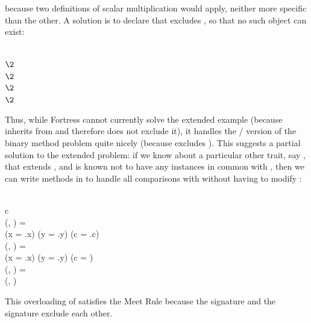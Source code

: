 because two definitions of scalar multiplication would apply, neither more specific than
the other.  A solution is to declare that  excludes ,
so that no such object can exist:
\begin{codeexamplesize}
\begin{tabbing}
 \\
\(\2\) \\
\(\2\) \\
\(\2\) \\
\(\2\) \\
\end{tabbing}
\end{codeexamplesize}
Thus, while Fortress cannot currently solve the extended 
example (because  inherits from  and therefore does
not exclude it), it handles the / version of the
binary method problem quite nicely (because  excludes ).
This suggests a partial solution to the extended  problem:
if we know about a particular other trait, say ,
that extends , and is known not to have any instances in
common with , then we can write  methods in 
to handle all comparisons with  without having to modify :
\begin{codeexamplesize}
\begin{FortressCode}
     \lbrace\,\,\rbrace \\
\2\+c\COLON {} \\
  (, \COLON {})\COLON {} = \\
  \2\+(x = .x) \wedge (y = .y) \wedge (c = .c)\- \\
  (, \COLON {})\COLON {} = \\
  \2\+(x = .x) \wedge (y = .y) \wedge (c = )\- \\
  (\COLON {}, )\COLON {} = \\
  \2\+(, )\-\- \\
\end{FortressCode}
\end{codeexamplesize}
This overloading of  satisfies the Meet Rule because the signature
 and the signature  exclude
each other.

